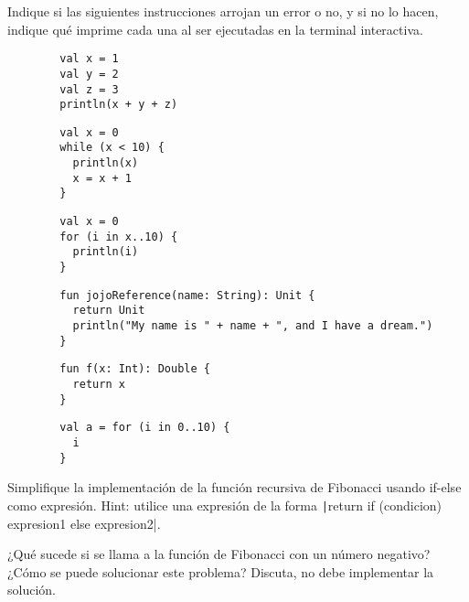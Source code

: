   \begin{Exercise}[title={¿Qué imprime?}]
    Indique si las siguientes instrucciones arrojan un error o no, y si no lo hacen, indique qué
    imprime cada una al ser ejecutadas en la terminal interactiva.

    \Question 
      \begin{verbatim}
        val x = 1
        val y = 2
        val z = 3
        println(x + y + z)
      \end{verbatim}
    \Question 
      \begin{verbatim}
        val x = 0
        while (x < 10) {
          println(x)
          x = x + 1
        }
      \end{verbatim}
    \Question
      \begin{verbatim}
        val x = 0
        for (i in x..10) {
          println(i)
        }
      \end{verbatim}
    \Question
      \begin{verbatim}
        fun jojoReference(name: String): Unit {
          return Unit
          println("My name is " + name + ", and I have a dream.")
        }
      \end{verbatim}
    \Question \begin{verbatim}
        fun f(x: Int): Double {
          return x
        }
      \end{verbatim}
    \Question \begin{verbatim}
        val a = for (i in 0..10) {
          i
        }
      \end{verbatim}
  \end{Exercise}

  \begin{Exercise}[title={Fibonacci}]
    \Question Simplifique la implementación de la función recursiva de Fibonacci usando if-else como 
      expresión. 
      Hint: utilice una expresión de la forma \texttt|return if (condicion) {expresion1} else {expresion2}|.

    \Question ¿Qué sucede si se llama a la función de Fibonacci con un número negativo?
      ¿Cómo se puede solucionar este problema?
      Discuta, no debe implementar la solución.
  \end{Exercise}
